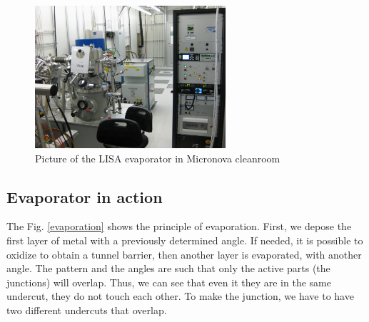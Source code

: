             \begin{figure}
                \centering
                \includegraphics[width=200pt]{LISA.JPG}
                \caption{Picture of the LISA evaporator in Micronova cleanroom}
            \end{figure}
            
            
            \subsection{Evaporator in action}
            
                \label{evapangles}
                The Fig. \ref{evaporation} shows the principle of evaporation. First, we depose the first layer of metal with a previously determined angle. If needed, it is possible to oxidize to obtain a tunnel barrier, then another layer is evaporated, with another angle. The pattern and the angles are such that only the active parts (the junctions) will overlap. Thus, we can see that even it they are in the same undercut, they do not touch each other. To make the junction, we have to have two different undercuts that overlap.
                
